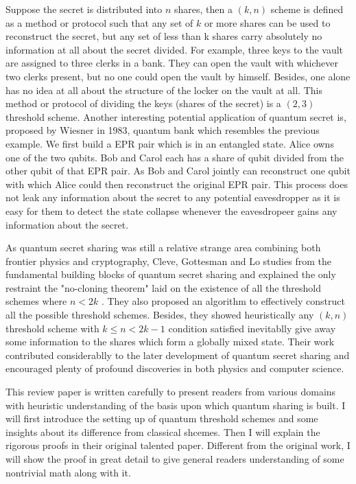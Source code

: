 \documentclass[12pt]{article}
\begin{document}
	Suppose the secret is distributed into $n$ shares, then a $(k,n)$ scheme is defined as a method or protocol such that any set of $k$ or more shares can be used to reconstruct the secret, but any set of less than k shares carry absolutely no information at all about the secret divided. 
	For example, three keys to the vault are assigned to three clerks in a bank. 
	They can open the vault with whichever two clerks present, but no one could open the vault by himself. 
	Besides, one alone has no idea at all about the structure of the locker on the vault at all. 
	This method or protocol of dividing the keys (shares of the secret) is a $(2,3)$ threshold scheme.
	Another interesting potential application of quantum secret is, proposed by Wiesner\cite{Wiesner} in 1983, quantum bank which resembles the previous example.
	We first build a EPR pair which is in an entangled state. Alice owns one of the two qubits. Bob and Carol each has a share of qubit divided from the other qubit of that EPR pair. As Bob and Carol jointly can reconstruct one qubit with which Alice could then reconstruct the original EPR pair. This process does not leak any information about the secret to any potential eavesdropper as it is easy for them to detect the state collapse whenever the eavesdropeer gains any information about the secret.

	As quantum secret sharing was still a relative strange area combining both frontier physics and cryptography, Cleve, Gottesman and Lo studies from the fundamental building blocks of quantum secret sharing and explained the only restraint the "no-cloning theorem" laid on the existence of all the threshold schemes where $n < 2k$ \cite{review}. They also proposed an algorithm to effectively construct all the possible threshold schemes. Besides, they showed heuristically any $(k, n)$ threshold scheme with $k \leq n < 2k-1$ condition satisfied inevitablly give away some information to the shares which form a globally mixed state. Their work contributed considerablly to the later development of quantum secret sharing and encouraged plenty of profound discoveries in both physics and computer science.

	This review paper is written carefully to present readers from various domains with heuristic understanding of the basis upon which quantum sharing is built. I will first introduce the setting up of quantum threshold schemes and some insights about its difference from classical shcemes. Then I will explain the rigorous proofs in their original talented paper. Different from the original work, I will show the proof in great detail to give general readers understanding of some nontrivial math along with it.\\
	
\end{document}
